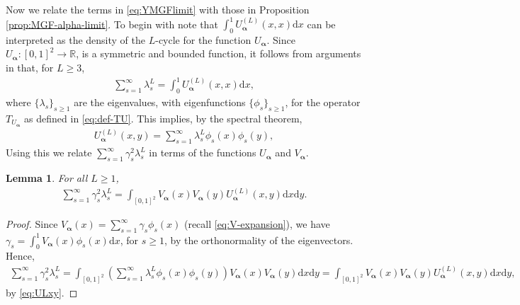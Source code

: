 \documentclass[11pt,reqno]{amsart}
\numberwithin{equation}{section}
\newtheorem{lemma}{Lemma}[section]
\theoremstyle{definition}
\begin{document}
Now we relate the terms in \eqref{eq:YMGFlimit} with those in Proposition \ref{prop:MGF-alpha-limit}. To begin with note that $\int_{0}^{1} U_{\bm \alpha}^{(L)}(x, x) \mathrm d x $ can be interpreted as the density of the $L$-cycle for the function $U_{\bm \alpha}$. Since $U_{\bm \alpha}: [0, 1]^2 \rightarrow \mathbb R$, is a symmetric and bounded function, it follows from arguments in \cite[Section 7.5]{lovasz2012large} that, for $L \geq 3$, 
\begin{align}\label{eq:ULcycle}
\sum_{s=1}^\infty \lambda_s^L = \int_{0}^{1} U_{\bm \alpha}^{(L)}(x, x) \mathrm d x , 
\end{align}
where $\{\lambda_{s}\}_{s \geq 1}$ are the eigenvalues, with eigenfunctions $\{\phi_{s}\}_{s \geq 1}$, for the operator $T_{U_{\bm \alpha}}$ as defined in \eqref{eq:def-TU}. 
This implies, by the spectral theorem, 
\begin{align}\label{eq:ULxy} 
 U_{\bm \alpha}^{(L)}(x,y) = \sum_{s=1}^\infty \lambda_s^{L} \phi_s(x) \phi_s(y) , 
\end{align} 
Using this we relate $\sum_{s=1}^{\infty}\gamma_{s}^{2}\lambda_{s}^{L}$ in terms of the functions $U_{\bm \alpha}$ and $V_{\bm \alpha}$.



\begin{lemma}\label{lemma:sum-delta-lambda}
For all $L \geq 1$,
\begin{align*}
    \sum_{s=1}^{\infty}\gamma_{s}^{2}\lambda_{s}^{L} = \int_{[0, 1]^2} V_{\bm \alpha}(x)V_{\bm \alpha}(y)U_{\bm \alpha}^{(L)}(x,y)\mathrm{d}x\mathrm{d}y . 
\end{align*}
\end{lemma}

\begin{proof} 
Since $V_{\bm \alpha}(x) = \sum_{s=1}^{\infty} \gamma_{s}\phi_{s}(x)$ (recall \eqref{eq:V-expansion}), we have $\gamma_{s} = \int_{0}^{1} V_{\bm \alpha}(x) \phi_{s}(x) \mathrm{d}x$, for $s \geq 1$, by the orthonormality of the eigenvectors. 
Hence, 
\begin{align*} 
\sum_{s=1}^{\infty}\gamma_{s}^{2}\lambda_{s}^{L} = \int_{[0, 1]^2} \left(\sum_{s=1}^\infty \lambda_{s}^{L} \phi_s(x) \phi_s(y) \right) V_{\bm \alpha}(x) V_{\bm \alpha}(y)  \mathrm d x \mathrm dy = \int_{[0, 1]^2} V_{\bm \alpha}(x)V_{\bm \alpha}(y)U_{\bm \alpha}^{(L)}(x,y)\mathrm{d}x\mathrm{d}y , 
\end{align*}
by \eqref{eq:ULxy}.
\end{proof}
\end{document}

